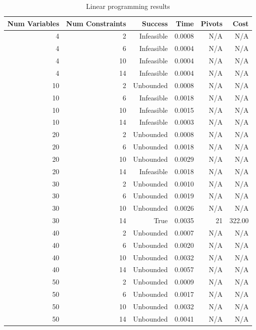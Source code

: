 \begin{table}[ht]
    \centering
    \begin{tabular}{rrrrrr}
        \toprule
        Num Variables & Num Constraints & Success & Time & Pivots & Cost \\
        \midrule
        4 & 2 & Infeasible & 0.0008 & N/A & N/A \\
		4 & 6 & Infeasible & 0.0004 & N/A & N/A \\
		4 & 10 & Infeasible & 0.0004 & N/A & N/A \\
		4 & 14 & Infeasible & 0.0004 & N/A & N/A \\
		10 & 2 & Unbounded & 0.0008 & N/A & N/A \\
		10 & 6 & Infeasible & 0.0018 & N/A & N/A \\
		10 & 10 & Infeasible & 0.0015 & N/A & N/A \\
		10 & 14 & Infeasible & 0.0003 & N/A & N/A \\
		20 & 2 & Unbounded & 0.0008 & N/A & N/A \\
		20 & 6 & Unbounded & 0.0018 & N/A & N/A \\
		20 & 10 & Unbounded & 0.0029 & N/A & N/A \\
		20 & 14 & Infeasible & 0.0018 & N/A & N/A \\
		30 & 2 & Unbounded & 0.0010 & N/A & N/A \\
		30 & 6 & Unbounded & 0.0019 & N/A & N/A \\
		30 & 10 & Unbounded & 0.0026 & N/A & N/A \\
		30 & 14 & True & 0.0035 & 21 & 322.00 \\
		40 & 2 & Unbounded & 0.0007 & N/A & N/A \\
		40 & 6 & Unbounded & 0.0020 & N/A & N/A \\
		40 & 10 & Unbounded & 0.0032 & N/A & N/A \\
		40 & 14 & Unbounded & 0.0057 & N/A & N/A \\
		50 & 2 & Unbounded & 0.0009 & N/A & N/A \\
		50 & 6 & Unbounded & 0.0017 & N/A & N/A \\
		50 & 10 & Unbounded & 0.0032 & N/A & N/A \\
		50 & 14 & Unbounded & 0.0041 & N/A & N/A \\
        \bottomrule
    \end{tabular}
    \caption{Linear programming results}
    \label{tab:lp-results}
\end{table}